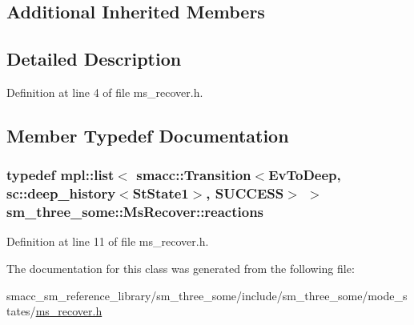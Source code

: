 \subsection*{Additional Inherited Members}


\subsection{Detailed Description}


Definition at line 4 of file ms\+\_\+recover.\+h.



\subsection{Member Typedef Documentation}
\subsubsection[{\texorpdfstring{reactions}{reactions}}]{\setlength{\rightskip}{0pt plus 5cm}typedef mpl\+::list$<$ {\bf smacc\+::\+Transition}$<${\bf Ev\+To\+Deep}, sc\+::deep\+\_\+history$<${\bf St\+State1}$>$, {\bf S\+U\+C\+C\+E\+SS}$>$ $>$ {\bf sm\+\_\+three\+\_\+some\+::\+Ms\+Recover\+::reactions}}\hypertarget{classsm__three__some_1_1MsRecover_a7cacea2d23f9c8ef0d5f93cff1106ebd}{}\label{classsm__three__some_1_1MsRecover_a7cacea2d23f9c8ef0d5f93cff1106ebd}


Definition at line 11 of file ms\+\_\+recover.\+h.



The documentation for this class was generated from the following file\+:\begin{DoxyCompactItemize}
\item 
smacc\+\_\+sm\+\_\+reference\+\_\+library/sm\+\_\+three\+\_\+some/include/sm\+\_\+three\+\_\+some/mode\+\_\+states/\hyperlink{ms__recover_8h}{ms\+\_\+recover.\+h}\end{DoxyCompactItemize}
